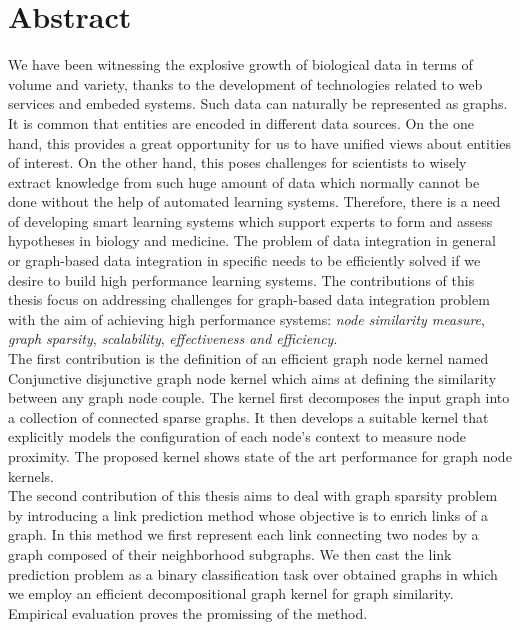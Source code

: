 \chapter*{Abstract}
We have been witnessing the explosive growth of biological data in terms of volume and variety, thanks to the development of technologies related to web services and embeded systems. Such data can naturally be represented as graphs. It is common that entities are encoded in different data sources. On the one hand, this provides a great opportunity for us to have unified views about entities of interest. On the other hand, this poses challenges for scientists to wisely extract knowledge from such huge amount of data which normally cannot be done without the help of automated learning systems. Therefore, there is a need of developing smart learning systems which support experts to form and assess hypotheses in biology and medicine. The problem of data integration in general or graph-based data integration in specific needs to be efficiently solved if we desire to build high performance learning systems. The contributions of this thesis focus on addressing challenges for graph-based data integration problem with the aim of achieving high performance systems: \textit{node similarity measure}, \textit{graph sparsity}, \textit{scalability}, \textit{effectiveness and efficiency}.\\

The first contribution is the definition of an efficient graph node kernel named Conjunctive disjunctive graph node kernel which aims at defining the similarity between any graph node couple. The kernel first decomposes the input graph into a collection of connected sparse graphs. It then develops a suitable kernel that explicitly models the configuration of each node's context to measure node proximity. The proposed kernel shows state of the art performance for graph node kernels.\\

The second contribution of this thesis aims to deal with graph sparsity problem by introducing a link prediction method whose objective is to enrich links of a graph. In this method we first represent each link connecting two nodes by a graph composed of their neighborhood subgraphs. We then cast the link prediction problem as a binary classification task over obtained graphs in which we employ an efficient decompositional graph kernel for graph similarity. Empirical evaluation proves the promissing of the method.\\

